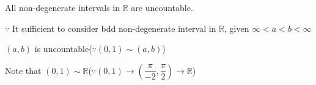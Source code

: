 All non-degenerate intervals in $\mathbb R$ are uncountable.

$\because$ It sufficient to consider bdd non-degenerate interval in $\mathbb R$, given $\infty < a < b < \infty$

$(a,b)$ is uncountable($\because(0,1) \sim (a,b)$)

Note that $(0,1)\sim \mathbb R$($\because (0,1) \rightarrow (\dfrac{\pi}{-2},\dfrac{\pi}{2}) \rightarrow \mathbb R$)



























